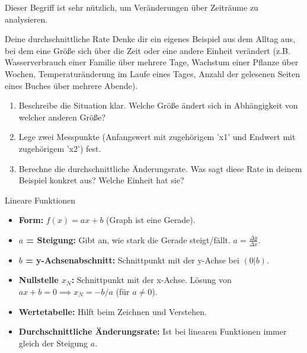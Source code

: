 Dieser Begriff ist sehr nützlich, um Veränderungen über Zeiträume zu analysieren.

\begin{aufgabenumgebung}{Deine durchschnittliche Rate}
Denke dir ein eigenes Beispiel aus dem Alltag aus, bei dem eine Größe sich über die Zeit oder eine andere Einheit verändert (z.B. Wasserverbrauch einer Familie über mehrere Tage, Wachstum einer Pflanze über Wochen, Temperaturänderung im Laufe eines Tages, Anzahl der gelesenen Seiten eines Buches über mehrere Abende).
\begin{enumerate}
    \item Beschreibe die Situation klar. Welche Größe ändert sich in Abhängigkeit von welcher anderen Größe?
    \item Lege zwei Messpunkte (Anfangswert mit zugehörigem 'x1' und Endwert mit zugehörigem 'x2') fest.
    \item Berechne die durchschnittliche Änderungsrate. Was sagt diese Rate in deinem Beispiel konkret aus? Welche Einheit hat sie?
\end{enumerate}
\end{aufgabenumgebung}

\begin{kurzknappumgebung}{Lineare Funktionen}
\begin{itemize}
    \item \textbf{Form:} $f(x) = ax+b$ (Graph ist eine Gerade).
    \item \textbf{$a$ = Steigung:} Gibt an, wie stark die Gerade steigt/fällt. $a = \frac{\Delta y}{\Delta x}$.
    \item \textbf{$b$ = y-Achsenabschnitt:} Schnittpunkt mit der y-Achse bei $(0|b)$.
    \item \textbf{Nullstelle $x_N$:} Schnittpunkt mit der x-Achse. Lösung von $ax+b=0 \implies x_N = -b/a$ (für $a \neq 0$).
    \item \textbf{Wertetabelle:} Hilft beim Zeichnen und Verstehen.
    \item \textbf{Durchschnittliche Änderungsrate:} Ist bei linearen Funktionen immer gleich der Steigung $a$.
\end{itemize}
\end{kurzknappumgebung}

